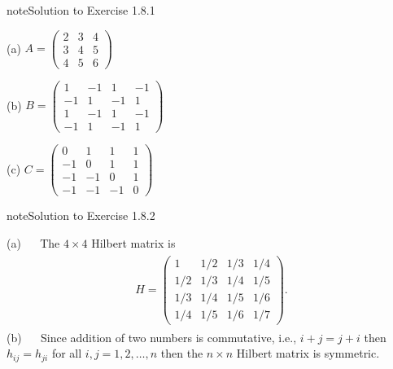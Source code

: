 \documentclass[letterpaper,10pt,english]{jupyterBook}
\begin{document}
\begin{sphinxadmonition}{note}{Solution to Exercise 1.8.1}



\sphinxAtStartPar
(a) \( A = \begin{pmatrix} 
    2 & 3 & 4 \\
    3 & 4 & 5 \\
    4 & 5 & 6 
    \end{pmatrix} \)

\sphinxAtStartPar
(b) \( B = \begin{pmatrix}
        1 & -1 & 1 & -1 \\
        -1 & 1 & -1 & 1 \\
        1 & -1 & 1 & -1 \\
        -1 & 1 & -1 & 1
        \end{pmatrix} \)

\sphinxAtStartPar
(c) \( C = \begin{pmatrix}
        0 & 1 & 1 & 1 \\
        -1 & 0 & 1 & 1 \\
        -1 & -1 & 0 & 1 \\
        -1 & -1 & -1 & 0
    \end{pmatrix} \)
\end{sphinxadmonition}
 \label{_pages/A1_Matrices_exercises_solutions:_pages/A1_Matrices_exercises_solutions-solution-1}

\begin{sphinxadmonition}{note}{Solution to Exercise 1.8.2}



\sphinxAtStartPar
(a)   The \(4 \times 4\) Hilbert matrix is
\begin{equation*}
\begin{split} \begin{align*}
    H = 
    \begin{pmatrix}
        1   & 1/2 & 1/3 & 1/4 \\
        1/2 & 1/3 & 1/4 & 1/5 \\
        1/3 & 1/4 & 1/5 & 1/6 \\
        1/4 & 1/5 & 1/6 & 1/7
    \end{pmatrix}.
\end{align*} \end{split}
\end{equation*}
\sphinxAtStartPar
(b)   Since addition of two numbers is commutative, i.e., \(i + j = j + i\) then \(h_{ij} = h_{ji}\) for all \(i, j = 1, 2, \ldots, n\) then the \(n \times n\) Hilbert matrix is symmetric.
\end{sphinxadmonition}
 \label{_pages/A1_Matrices_exercises_solutions:_pages/A1_Matrices_exercises_solutions-solution-2}
\end{document}
